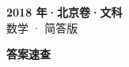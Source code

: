 \documentclass[zihao=-4, a4paper]{ctexart}
\begin{document}
\begin{center}
  {\Large\bfseries 2018 年·北京卷·文科}\\[4pt]
  {\large 数学 · 简答版}
\end{center}
\medskip
{}

\clearpage
{}
\begin{center}{\Large\bfseries 答案速查}\end{center}
\medskip

\end{document}

